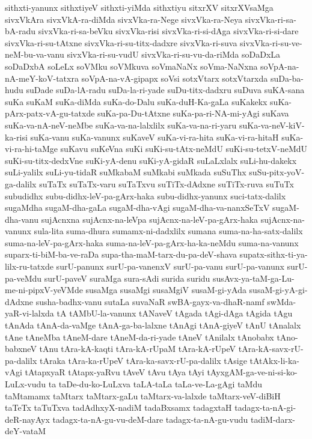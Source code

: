 {sithxti-yanunx
sithxtiyeV
sithxti-yiMda
sithxtiyu
sitxrXV
sitxrXVsaMga
sivxVkAra
sivxVkA-ra-diMda
sivxVka-ra-Nege
sivxVka-ra-Neya
sivxVka-ri-sa-bA-radu
sivxVka-ri-sa-beVku
sivxVka-risi
sivxVka-ri-si-dAga
sivxVka-ri-si-dare
sivxVka-ri-su-tAtxne
sivxVka-ri-su-titx-dadxre
sivxVka-ri-suva
sivxVka-ri-su-ve-neM-bu-va-vanu
sivxVka-ri-su-vudU
sivxVka-ri-su-vu-da-riMda
soDaDxLa
soDaDxbA
soLeLx
soVMku
soVMkuva
soVmaNaNx
soVma-NaNxna
soVpA-na-nA-meY-koV-tatxra
soVpA-na-vA-gipapx
soVsi
sotxVtarx
sotxVtarxda
suDa-ba-hudu
suDade
suDa-lA-radu
suDa-la-ri-yade
suDu-titx-dadxru
suDuva
suKA-sana
suKa
suKaM
suKa-diMda
suKa-do-Dalu
suKa-duH-Ka-gaLa
suKakekx
suKa-pArx-patx-vA-gu-tatxde
suKa-pa-Du-tAtxne
suKa-pa-ri-NA-mi-yAgi
suKava
suKa-va-nA-neV-neMbe
suKa-va-na-lalxlilx
suKa-va-na-ri-yaru
suKa-va-neV-kiV-ka-risi
suKa-vanu
suKa-vanunx
suKaveV
suKa-vi-ra-hita
suKa-vi-ra-hitaH
suKa-vi-ra-hi-taMge
suKavu
suKeVna
suKi
suKi-su-tAtx-neMdU
suKi-su-tetxV-neMdU
suKi-su-titx-dedxVne
suKi-yA-denu
suKi-yA-gidaR
suLaLxlalx
suLi-hu-dakekx
suLi-yalilx
suLi-yu-tidaR
suMkabaM
suMkabi
suMkada
suSuThx
suSu-pitx-yoV-ga-dalilx
suTaTx
suTaTx-varu
suTaTxvu
suTiTx-dAdxne
suTiTx-ruva
suTuTx
subudidhx
subu-didhx-leV-pa-gArx-haka
subu-didhx-yanunx
suci-tatx-dalilx
sugaMdha
sugaM-dha-gaLa
sugaM-dha-vAgi
sugaM-dha-va-nanxSeTxV
sugaM-dha-vanu
sujAcnxna
sujAcnx-na-leVpa
sujAcnx-na-leV-pa-gArx-haka
sujAcnx-na-vanunx
sula-lita
suma-dhura
sumamx-ni-dadxlilx
sumana
suma-na-ha-satx-dalilx
suma-na-leV-pa-gArx-haka
suma-na-leV-pa-gArx-ha-ka-neMdu
suma-na-vanunx
suparx-ti-biM-ba-ve-raDa
supa-tha-maM-tarx-du-pa-deV-shava
supatx-sithx-ti-ya-lilx-ru-tatxde
surU-panunx
surU-pa-vanenxV
surU-pa-vanu
surU-pa-vanunx
surU-pa-veMdu
surU-paveV
suraMga
sura-sAdi
surida
suridu
susAvx-ya-taM-ga-Lu-me-ni-pipxV-yeVMde
susaMga
susaMgi
susaMgiV
susaM-gi-yAda
susaM-gi-yA-gi-dAdxne
susha-badhx-vanu
sutaLa
suvaNaR
swBA-gayx-va-dhaR-namf
swMda-yaR-vi-lalxda
tA
tAMbU-la-vanunx
tANaveV
tAgada
tAgi-dAga
tAgida
tAgu
tAnAda
tAnA-da-vaMge
tAnA-ga-ba-lalxne
tAnAgi
tAnA-giyeV
tAnU
tAnalalx
tAne
tAneMba
tAneM-dare
tAneM-da-ri-yade
tAneV
tAnilalx
tAnobabx
tAno-babxneV
tAnu
tAra-kA-kaqti
tAra-kA-rUpaM
tAra-kA-rUpeV
tAra-kA-savx-rU-pa-dalilx
tAraka
tAra-ka-rUpeV
tAra-ka-savx-rU-pa-dalilx
tAsige
tAtAkx-li-ka-vAgi
tAtapxyaR
tAtapx-yaRvu
tAveV
tAvu
tAya
tAyi
tAyxgAM-ga-ve-ni-si-ko-LuLx-vudu
ta
taDe-du-ko-LuLxva
taLA-taLa
taLa-ve-La-gAgi
taMdu
taMtamamx
taMtarx
taMtarx-gaLu
taMtarx-va-lalxde
taMtarx-veV-diBiH
taTeTx
taTuTxva
tadAdhxyX-nadiM
tadaBxsamx
tadagxtaH
tadagx-ta-nA-gi-deR-nayAyx
tadagx-ta-nA-gu-vu-deM-dare
tadagx-ta-nA-gu-vudu
tadiM-darx-deY-vataM
}

